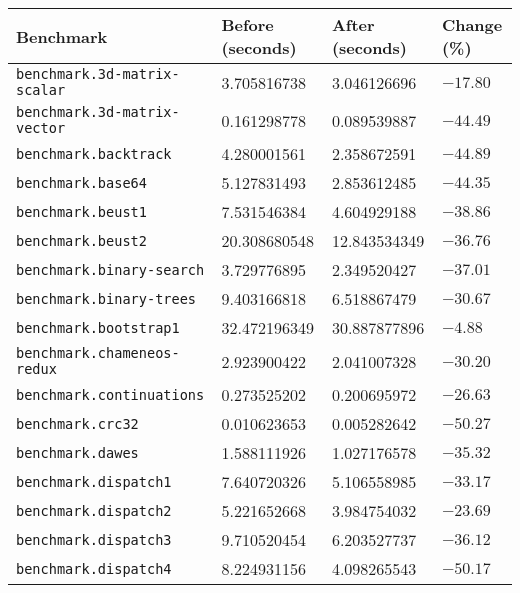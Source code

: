 \begin{longtable}{llll}
\toprule
Benchmark & Before (seconds) & After (seconds) & Change (\%) \\
\midrule
\endhead
\texttt{benchmark.3d-matrix-scalar}         & 3.705816738       & 3.046126696         & $-17.80$    \\
\texttt{benchmark.3d-matrix-vector}         & 0.161298778       & 0.089539887         & $-44.49$    \\
\texttt{benchmark.backtrack}                & 4.280001561       & 2.358672591         & $-44.89$    \\
\texttt{benchmark.base64}                   & 5.127831493       & 2.853612485         & $-44.35$    \\
\texttt{benchmark.beust1}                   & 7.531546384       & 4.604929188         & $-38.86$    \\
\texttt{benchmark.beust2}                   & 20.308680548      & 12.843534349        & $-36.76$    \\
\texttt{benchmark.binary-search}            & 3.729776895       & 2.349520427         & $-37.01$    \\
\texttt{benchmark.binary-trees}             & 9.403166818       & 6.518867479         & $-30.67$    \\
\texttt{benchmark.bootstrap1}               & 32.472196349      & 30.887877896        & $-4.88$     \\
\texttt{benchmark.chameneos-redux}          & 2.923900422       & 2.041007328         & $-30.20$    \\
\texttt{benchmark.continuations}            & 0.273525202       & 0.200695972         & $-26.63$    \\
\texttt{benchmark.crc32}                    & 0.010623653       & 0.005282642         & $-50.27$    \\
\texttt{benchmark.dawes}                    & 1.588111926       & 1.027176578         & $-35.32$    \\
\texttt{benchmark.dispatch1}                & 7.640720326       & 5.106558985         & $-33.17$    \\
\texttt{benchmark.dispatch2}                & 5.221652668       & 3.984754032         & $-23.69$    \\
\texttt{benchmark.dispatch3}                & 9.710520454       & 6.203527737         & $-36.12$    \\
\texttt{benchmark.dispatch4}                & 8.224931156       & 4.098265543         & $-50.17$    \\

\end{longtable}
